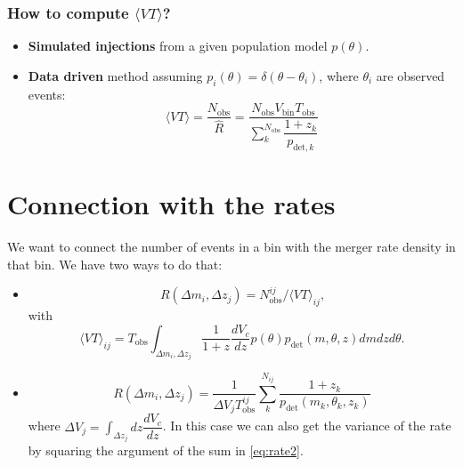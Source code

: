 \documentclass[12pt,a4paper]{article}
\begin{document}
\subsubsection{How to compute \(\langle VT \rangle\)?}
\begin{itemize}
    \item \textbf{Simulated injections} from a given population model \(p(\theta)\).
    \item \textbf{Data driven} method assuming \(p_i(\theta) = \delta(\theta - \theta_i)\), where \(\theta_i\) are observed events: \begin{equation} \label{eq:VT_point}
        \langle VT \rangle = \dfrac{N_\text{obs}}{\hat{R}} = \dfrac{N_\text{obs} V_\text{bin} T_\text{obs}}{\sum_k^{N_\text{obs}} \dfrac{1+z_k}{p_{\text{det}, k}}}
    \end{equation}
\end{itemize}

\section{Connection with the rates}
We want to connect the number of events in a bin with the merger rate density in that bin. We have two ways to do that:
\begin{itemize}
    \item \begin{equation} \label{eq:rate}
        R(\Delta m_i, \Delta z_j) = N_\text{obs}^{ij} / \langle VT \rangle_{ij} \text{,}
    \end{equation} with \begin{equation} \label{eq:VT}
        \langle VT \rangle_{ij} = T_\text{obs} \int_{\Delta m_i, \Delta z_j} \dfrac{1}{1+z} \dfrac{dV_c}{dz} p(\theta)p_\text{det}(m, \theta, z) dm dz d\theta \text{.}
    \end{equation}
    \item \begin{equation} \label{eq:rate2}
        R(\Delta m_i, \Delta z_j) = \dfrac{1}{\Delta V_j T_\text{obs}^{ij}} \sum_k^{N_{ij}} \dfrac{1 + z_k}{p_\text{det}(m_k, \theta_k, z_k)}
    \end{equation} where \(\Delta V_j = \int_{\Delta z_j} dz \dfrac{dV_c}{dz}\). In this case we can also get the variance of the rate by squaring the argument of the sum in \eqref{eq:rate2}.
\end{itemize}
\end{document}
